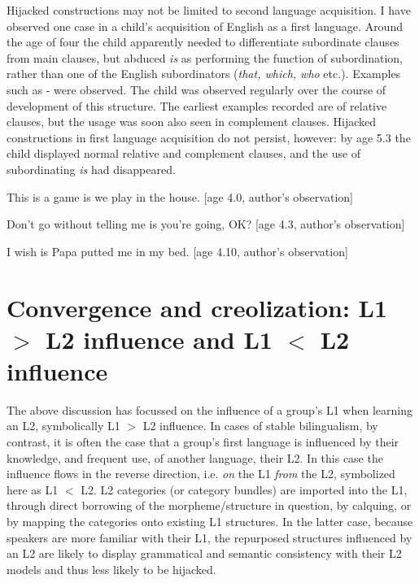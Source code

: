 Hijacked constructions may not be limited to second language acquisition. I have observed one case in a child's acquisition of English as a first language. Around the age of four the child apparently needed to differentiate subordinate clauses from main clauses, but abduced \textit{is} as performing the function of subordination, rather than one of the English subordinators (\textit{that, which, who} etc.). Examples such as - were observed. The child was observed regularly over the course of development of this structure. The earliest examples recorded are of relative clauses, but the usage was soon also seen in complement clauses. Hijacked constructions in first language acquisition do not persist, however: by age 5.3 the child displayed normal relative and complement clauses, and the use of subordinating \textit{is} had disappeared.

\ea\label{smith:ex:2}
This is a game is we play in the house. [age 4.0, author's observation]
\z

\ea\label{smith:ex:3}
Don't go without telling me is you're going, OK? [age 4.3, author's observation]
\z

\ea\label{smith:ex:4}
I wish is Papa putted me in my bed. [age 4.10, author's observation]
\z

\section[Convergence and creolization: L1$\gtrless$L2 influence]{Convergence and creolization: L1 $>$ L2 influence and L1 $<$ L2 influence}\label{smith:sec:3}

The above discussion has focussed on the influence of a group's L1 when learning an L2, symbolically L1 $>$ L2 influence. In cases of stable bilingualism, by contrast, it is often the case that a group's first language is influenced by their knowledge, and frequent use, of another language, their L2. In this case the influence flows in the reverse direction, i.e. \textit{on} the L1 \textit{from} the L2, symbolized here as L1 $<$ L2. L2 categories (or category bundles) are imported into the L1, through direct borrowing of the morpheme/structure in question, by calquing, or by mapping the categories onto existing L1 structures. In the latter case, because speakers are more familiar with their L1, the repurposed structures influenced by an L2 are likely to display grammatical and semantic consistency with their L2 models and thus less likely to be hijacked. 

